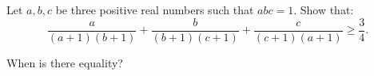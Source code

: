 Let $a,b,c$ be three positive real numbers such that $abc=1$. Show that:\[ \displaystyle \frac{a}{(a+1)(b+1)}+\frac{b}{(b+1)(c+1)}+ \frac{c}{(c+1)(a+1)} \geq \frac{3}{4}.  \]

When is there equality?